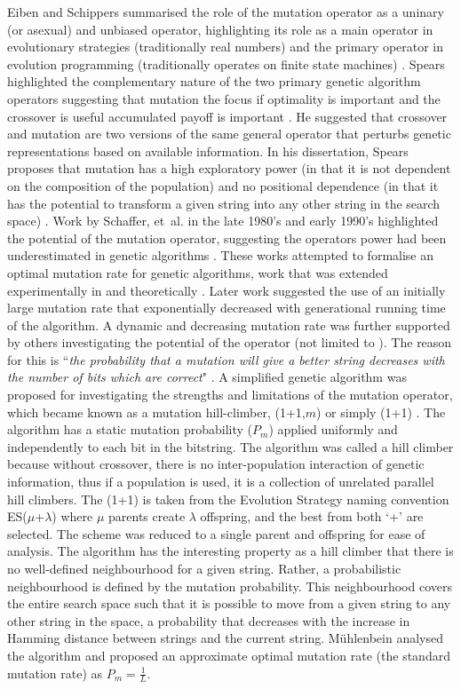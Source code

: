 Eiben and Schippers summarised the role of the mutation operator as a uninary (or asexual) and unbiased operator, highlighting its role as a main operator in evolutionary strategies (traditionally real numbers) and the primary operator in evolution programming (traditionally operates on finite state machines) \cite{Eiben1998}. Spears highlighted the complementary nature of the two primary genetic algorithm operators suggesting that mutation the focus if optimality is important and the crossover is useful accumulated payoff is important \cite{Spears1992}. He suggested that crossover and mutation are two versions of the same general operator that perturbs genetic representations based on available information. In his dissertation, Spears proposes that mutation has a high exploratory power (in that it is not dependent on the composition of the population) and no positional dependence (in that it has the potential to transform a given string into any other string in the search space) \cite{Spears1998}. Work by Schaffer, et~al. in the late 1980's and early 1990's highlighted the potential of the mutation operator, suggesting the operators power had been underestimated in genetic algorithms \cite{Schaffer1991, Schaffer1989}. These works attempted to formalise an optimal mutation rate for genetic algorithms, work that was extended experimentally in \cite{Schaffer1989} and theoretically \cite{Hesser1991}. Later work suggested the use of an initially large mutation rate that exponentially decreased with generational running time of the algorithm. A dynamic and decreasing mutation rate was further supported by others investigating the potential of the operator (not  limited to \cite{Muhlenbein1992, Fogarty1989}). The reason for this is ``\emph{the probability that a mutation will give a better string decreases with the number of bits which are correct}" \cite{Back1993}.
A simplified genetic algorithm was proposed for investigating the strengths and limitations of the mutation operator, which became known as a mutation hill-climber, (1+1,$m$) \cite{Muhlenbein1992} or simply (1+1) \cite{Back1993}. The algorithm has a static mutation probability ($P_{m}$) applied uniformly and independently to each bit in the bitstring. The algorithm was called a hill climber because without crossover, there is no inter-population interaction of genetic information, thus if a population is used, it is a collection of unrelated parallel hill climbers. The (1+1) is taken from the Evolution Strategy naming convention ES($\mu$+$\lambda$) where $\mu$  parents create $\lambda$ offspring, and the best from both `+' are selected. The scheme was reduced to a single parent and offspring for ease of analysis. The algorithm has the interesting property as a hill climber that there is no well-defined neighbourhood for a given string. Rather, a probabilistic neighbourhood is defined by the mutation probability. This neighbourhood covers the entire search space such that it is possible to move from a given string to any other string in the space, a probability that decreases with the increase in Hamming distance between strings and the current string. M{\"u}hlenbein analysed the algorithm and proposed an approximate optimal mutation rate (the standard mutation rate) as $P_{m} = \frac{1}{L}$.

